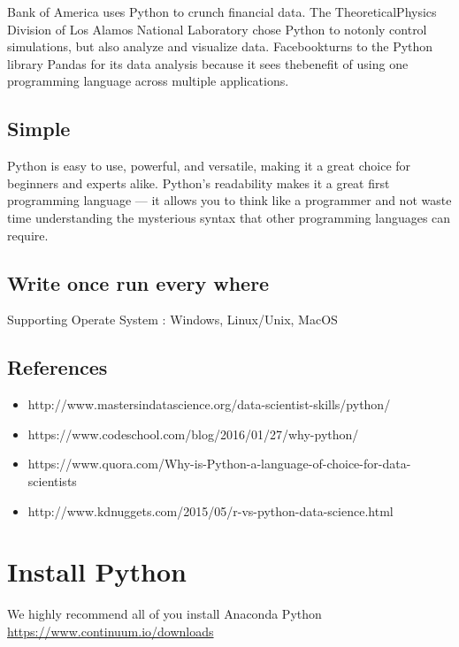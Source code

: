\documentclass[11pt]{article}
\providecommand{\tightlist}{%
      \setlength{\itemsep}{0pt}\setlength{\parskip}{0pt}}
\begin{document}
Bank of America uses Python to crunch financial data. The
TheoreticalPhysics Division of Los Alamos National Laboratory chose
Python to notonly control simulations, but also analyze and visualize
data. Facebookturns to the Python library Pandas for its data analysis
because it sees thebenefit of using one programming language across
multiple applications.

\subsection{Simple}\label{simple}

Python is easy to use, powerful, and versatile, making it a great choice
for beginners and experts alike. Python's readability makes it a great
first programming language --- it allows you to think like a programmer
and not waste time understanding the mysterious syntax that other
programming languages can require.

\subsection{Write once run every
where}\label{write-once-run-every-where}

Supporting Operate System : Windows, Linux/Unix, MacOS

\subsection{References}\label{references}

\begin{itemize}
\tightlist
\item
  http://www.mastersindatascience.org/data-scientist-skills/python/
\item
  https://www.codeschool.com/blog/2016/01/27/why-python/
\item
  https://www.quora.com/Why-is-Python-a-language-of-choice-for-data-scientists
\item
  http://www.kdnuggets.com/2015/05/r-vs-python-data-science.html
\end{itemize}

    \section{Install Python}\label{install-python}

We highly recommend all of you install Anaconda Python
\url{https://www.continuum.io/downloads}
\end{document}
